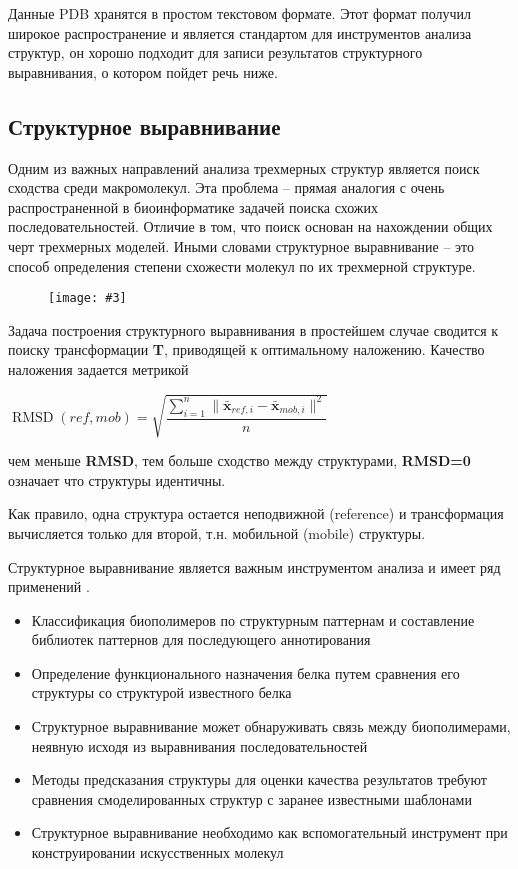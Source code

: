 \documentclass[a4paper, 12pt, titlepage, utf8]{extarticle}
\newenvironment{myfigure}[2]%
{\pushQED{\caption{#1} \label{#2}} %
    \begin{figure}[h!tb]\centering } %
{  \popQED %
    \end{figure}}
\newcommand{\includefigure}[3][]{
\begin{myfigure}{#2}{fig:#3}
    \texttt{[image: \#3]}
\end{myfigure}
}
\begin{document}
Данные PDB хранятся в простом текстовом формате. Этот формат получил широкое распространение и является стандартом для инструментов анализа структур, он хорошо подходит для записи результатов структурного выравнивания, о котором пойдет речь ниже.

\subsection{Структурное выравнивание}
Одним из важных направлений анализа трехмерных структур является поиск сходства среди макромолекул. Эта проблема -- прямая аналогия с очень распространенной в биоинформатике задачей поиска схожих последовательностей. Отличие в том, что поиск основан на нахождении общих черт трехмерных моделей. Иными словами структурное выравнивание -- это способ определения степени схожести молекул по их трехмерной структуре.

\includefigure[clip, trim=0 19.5cm 0 1cm, width=\linewidth]{Структурное выравнивание}{method.pdf}

Задача построения структурного выравнивания в простейшем случае сводится к поиску трансформации \textbf{T}, приводящей к оптимальному наложению. Качество наложения задается метрикой 
\begin{center} $ \operatorname{RMSD}(ref, mob) = \sqrt{ \dfrac{\sum_{i=1}^n \| \mathbf{\bar{x}}_{ref,i} -  \mathbf{\bar{x}}_{mob,i} \| ^2} {n} } $ \end{center}
чем меньше \textbf{RMSD}, тем больше сходство между структурами,  \textbf{RMSD=0}  означает что структуры идентичны.

Как правило, одна структура остается неподвижной (reference) и трансформация вычисляется только для второй, т.н. мобильной (mobile) структуры.

Структурное выравнивание является важным инструментом анализа и имеет ряд применений \cite{structural-bionformatics}.
\begin{itemize}
    \item Классификация биополимеров по структурным паттернам и составление библиотек паттернов для последующего аннотирования
    \item Определение функционального назначения белка путем сравнения его структуры со структурой известного белка
    \item Структурное выравнивание может обнаруживать связь между биополимерами, неявную исходя из выравнивания последовательностей 
    \item Методы предсказания структуры для оценки качества результатов требуют сравнения смоделированных структур с заранее известными шаблонами
    \item Структурное выравнивание необходимо как вспомогательный инструмент при конструировании искусственных молекул
\end{itemize}
\end{document}
